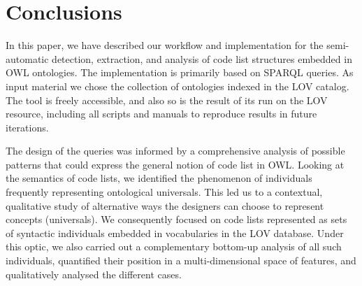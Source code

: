 \section{Conclusions}
\label{s:conclusion}
In this paper, we have described our workflow and implementation for the semi-automatic detection, extraction, and analysis of code list structures embedded in OWL ontologies. 
The implementation is primarily based on SPARQL queries.
As input material we chose the collection of ontologies indexed in the LOV catalog.
The tool is freely accessible, and also so is the result of its run on the LOV resource, including all scripts and manuals to reproduce results in future iterations.

The design of the queries was informed by a comprehensive analysis of possible patterns that could express the general notion of code list in OWL.
Looking at the semantics of code lists, we identified the phenomenon of individuals frequently representing ontological universals. 
This led us to a contextual, qualitative study of alternative ways the designers can choose to represent concepts (universals).
We consequently focused on code lists represented as sets of syntactic individuals embedded in vocabularies in the LOV database.
Under this optic, we also carried out a complementary bottom-up analysis of all such individuals, quantified their position in a multi-dimensional space of features, and qualitatively analysed the different cases.



